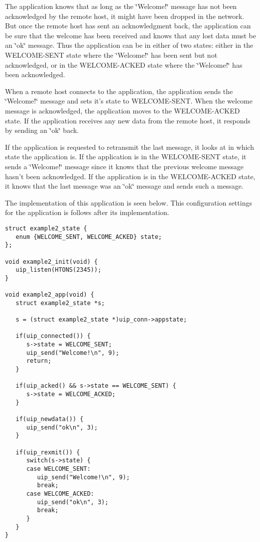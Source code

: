 The application knows that as long as the \char`\"{}Welcome!\char`\"{} message has not been acknowledged by the remote host, it might have been dropped in the network. But once the remote host has sent an acknowledgment back, the application can be sure that the welcome has been received and knows that any lost data must be an \char`\"{}ok\char`\"{} message. Thus the application can be in either of two states: either in the WELCOME-SENT state where the \char`\"{}Welcome!\char`\"{} has been sent but not acknowledged, or in the WELCOME-ACKED state where the \char`\"{}Welcome!\char`\"{} has been acknowledged.

When a remote host connects to the application, the application sends the \char`\"{}Welcome!\char`\"{} message and sets it's state to WELCOME-SENT. When the welcome message is acknowledged, the application moves to the WELCOME-ACKED state. If the application receives any new data from the remote host, it responds by sending an \char`\"{}ok\char`\"{} back.

If the application is requested to retransmit the last message, it looks at in which state the application is. If the application is in the WELCOME-SENT state, it sends a \char`\"{}Welcome!\char`\"{} message since it knows that the previous welcome message hasn't been acknowledged. If the application is in the WELCOME-ACKED state, it knows that the last message was an \char`\"{}ok\char`\"{} message and sends such a message.

The implementation of this application is seen below. This configuration settings for the application is follows after its implementation.



\footnotesize\begin{verbatim}struct example2_state {
   enum {WELCOME_SENT, WELCOME_ACKED} state;
};

void example2_init(void) {
   uip_listen(HTONS(2345));
}

void example2_app(void) {
   struct example2_state *s;

   s = (struct example2_state *)uip_conn->appstate;
   
   if(uip_connected()) {
      s->state = WELCOME_SENT;
      uip_send("Welcome!\n", 9);
      return;
   } 

   if(uip_acked() && s->state == WELCOME_SENT) {
      s->state = WELCOME_ACKED;
   }

   if(uip_newdata()) {
      uip_send("ok\n", 3);
   }

   if(uip_rexmit()) {
      switch(s->state) {
      case WELCOME_SENT:
         uip_send("Welcome!\n", 9);
         break;
      case WELCOME_ACKED:
         uip_send("ok\n", 3);
         break;
      }
   }
}
\end{verbatim}
\normalsize


